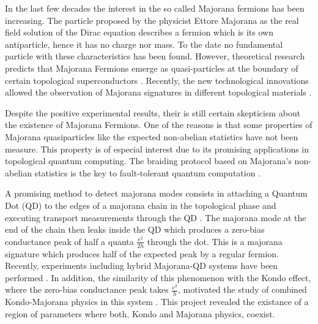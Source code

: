 \documentclass[showpacs,aps,prb,reprint,superscriptaddress]{revtex4-1}
\begin{document}
In the last few decades the interest in the so called Majorana fermions has been increasing. The particle proposed by the physicist Ettore Majorana  as the real field solution of the Dirac equation describes a fermion which is its own antiparticle, hence it has no charge nor mass. To the date no fundamental particle with these characteristics has been found. However,  theoretical research predicts that Majorana Fermions emerge as quasi-particles at the boundary of certain topological superconductors \citet{kitaev_unpaired_2001}. Recently, the new technological innovations  allowed the observation of Majorana signatures in different topological materials \citep{mourik_signatures_2012,das_zero-bias_2012,deng_anomalous_2012,zhang_quantized_2018} . 

Despite the positive experimental results, their is still certain skepticism about the existence of  Majorana Fermions. One of the reasons  is that some properties of Majorana quasiparticles like the expected non-abelian statistics have not been measure. This property is of especial interest due to its promising applications in topological quantum computing. The braiding protocol based on  Majorana's non-abelian statistics is the key to  fault-tolerant quantum computation \cite{kitaev_fault-tolerant_2003,sarma_majorana_2015}. 


A promising method to detect majorana modes consists in attaching a Quantum Dot (QD) to the edges of a majorana chain in the topological phase and executing transport measurements through the QD \cite{liu_detecting_2011} . The majorana mode at the end of the chain then leaks inside the QD \cite{vernek_subtle_2014} which produces a zero-bias conductance peak of half a quanta $\frac{e^{2}}{2h}$ through the dot. This is a majorana signature which produces half of the expected peak by a regular fermion.  Recently, experiments including hybrid Majorana-QD systems have been performed \cite{deng_majorana_2016} . In addition, the similarity of this phenomenon with the Kondo effect, where the zero-bias conductance peak takes  $\frac{e^{2}}{h}$, motivated the study of combined Kondo-Majorana physics in this system \cite{lee_kondo_2013,ruiz-tijerina_interaction_2015}. This project revealed the existance of a region of parameters where both, Kondo and Majorana physics, coexist. 
\end{document}
